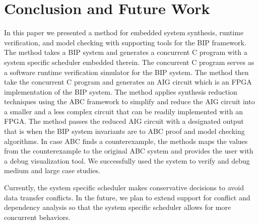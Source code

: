 \section{Conclusion and Future Work}
\label{sect-conclusion}

In this paper we presented a method for embedded system synthesis, runtime verification,
and model checking with supporting tools for the BIP framework. 
The method takes a BIP system and generates a concurrent C program with a system 
specific scheduler embedded therein. 
The concurrent C program serves as a software runtime verification simulator for the 
BIP system.
The method then take the concurrent C program and generates an AIG circuit which is an
FPGA implementation of the BIP system. 
The method applies synthesis reduction techniques using the ABC framework 
to simplify and reduce the AIG circuit
into a smaller and a less complex circuit that can be readily implemented with an 
FPGA. 
The method passes the reduced AIG circuit with a designated output that is \true
when the BIP system invariants are \true to ABC proof and model checking 
algorithms. In case ABC finds a counterexample, the methods maps the values from 
the counterexample to the original ABC system and provides the user with a debug
visualization tool. 
We successfully used the system to verify and debug medium and large case studies. 

Currently, the system specific scheduler makes conservative decisions to avoid 
data transfer conflicts. In the future, we plan to extend support for conflict and 
dependency analysis so that the system specific scheduler allows for more concurrent
behaviors. 




